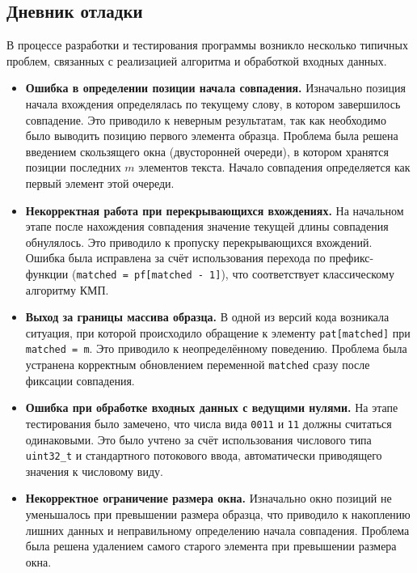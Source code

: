 \documentclass[12pt]{article}
\begin{document}
\subsection*{Дневник отладки}

В процессе разработки и тестирования программы возникло несколько типичных проблем, связанных с реализацией алгоритма и обработкой входных данных.

\begin{itemize}
	\item \textbf{Ошибка в определении позиции начала совпадения.}  
	Изначально позиция начала вхождения определялась по текущему слову, в котором завершилось совпадение. Это приводило к неверным результатам, так как необходимо было выводить позицию первого элемента образца. Проблема была решена введением скользящего окна (двусторонней очереди), в котором хранятся позиции последних $m$ элементов текста. Начало совпадения определяется как первый элемент этой очереди.
	
	\item \textbf{Некорректная работа при перекрывающихся вхождениях.}  
	На начальном этапе после нахождения совпадения значение текущей длины совпадения обнулялось. Это приводило к пропуску перекрывающихся вхождений. Ошибка была исправлена за счёт использования перехода по префикс-функции (\texttt{matched = pf[matched - 1]}), что соответствует классическому алгоритму КМП.
	
	\item \textbf{Выход за границы массива образца.}  
	В одной из версий кода возникала ситуация, при которой происходило обращение к элементу \texttt{pat[matched]} при \texttt{matched = m}. Это приводило к неопределённому поведению. Проблема была устранена корректным обновлением переменной \texttt{matched} сразу после фиксации совпадения.
	
	\item \textbf{Ошибка при обработке входных данных с ведущими нулями.}  
	На этапе тестирования было замечено, что числа вида \texttt{0011} и \texttt{11} должны считаться одинаковыми. Это было учтено за счёт использования числового типа \texttt{uint32\_t} и стандартного потокового ввода, автоматически приводящего значения к числовому виду.
	
	\item \textbf{Некорректное ограничение размера окна.}  
	Изначально окно позиций не уменьшалось при превышении размера образца, что приводило к накоплению лишних данных и неправильному определению начала совпадения. Проблема была решена удалением самого старого элемента при превышении размера окна.
	

\end{itemize}
\end{document}
